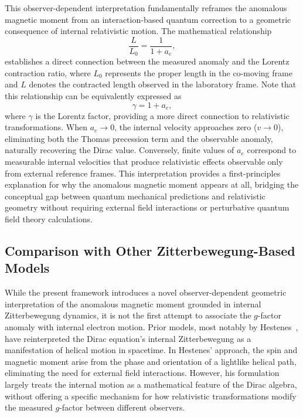\documentclass[%
 reprint,
 amsmath,amssymb,
 aps,
]{revtex4-1}
\numberwithin{equation}{section}%
\begin{document}
This observer-dependent interpretation fundamentally reframes the anomalous magnetic moment from an interaction-based quantum correction to a geometric consequence of internal relativistic motion. The mathematical relationship 
\begin{equation}
    \frac{L}{L_0} = \frac{1}{1 + a_e},
    \label{eq:length_contraction}
\end{equation}
establishes a direct connection between the measured anomaly and the Lorentz contraction ratio, where $L_0$ represents the proper length in the co-moving frame and $L$ denotes the contracted length observed in the laboratory frame. Note that this relationship can be equivalently expressed as 
\begin{equation}
\gamma = 1 + a_e,
\label{eq:gamma_anomaly_relation}
\end{equation}
where $\gamma$ is the Lorentz factor, providing a more direct connection to relativistic transformations. When $a_e \to 0$, the internal velocity approaches zero ($v \to 0$), eliminating both the Thomas precession term and the observable anomaly, naturally recovering the Dirac value. Conversely, finite values of $a_e$ correspond to measurable internal velocities that produce relativistic effects observable only from external reference frames. This interpretation provides a first-principles explanation for why the anomalous magnetic moment appears at all, bridging the conceptual gap between quantum mechanical predictions and relativistic geometry without requiring external field interactions or perturbative quantum field theory calculations.

\subsection{Comparison with Other Zitterbewegung-Based Models}

While the present framework introduces a novel observer-dependent geometric interpretation of the anomalous magnetic moment grounded in internal Zitterbewegung dynamics, it is not the first attempt to associate the $g$-factor anomaly with internal electron motion. Prior models, most notably by Hestenes~\cite{hestenes1990,hestenes2010}, have reinterpreted the Dirac equation's internal Zitterbewegung as a manifestation of helical motion in spacetime. In Hestenes' approach, the spin and magnetic moment arise from the phase and orientation of a lightlike helical path, eliminating the need for external field interactions. However, his formulation largely treats the internal motion as a mathematical feature of the Dirac algebra, without offering a specific mechanism for how relativistic transformations modify the measured $g$-factor between different observers.
\end{document}
